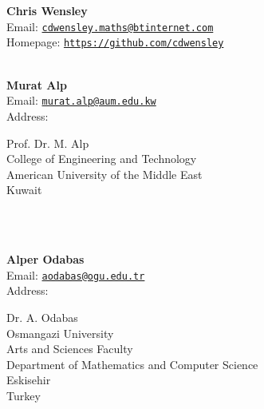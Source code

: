 \documentclass[a4paper,11pt]{report}
\begin{document}
\begin{titlepage}
\mbox{}\\
{\mbox{}\\
\small \noindent \textbf{ Chris Wensley\\
   }  Email: \href{mailto://cdwensley.maths@btinternet.com} {\texttt{cdwensley.maths@btinternet.com}}\\
  Homepage: \href{https://github.com/cdwensley} {\texttt{https://github.com/cdwensley}}}\\
{\mbox{}\\
\small \noindent \textbf{ Murat Alp\\
   }  Email: \href{mailto://murat.alp@aum.edu.kw} {\texttt{murat.alp@aum.edu.kw}}\\
  Address: \begin{minipage}[t]{8cm}\noindent
 Prof. Dr. M. Alp\\
 College of Engineering and Technology\\
 American University of the Middle East\\
 Kuwait\\
 \end{minipage}
}\\
{\mbox{}\\
\small \noindent \textbf{ Alper Odabas\\
   }  Email: \href{mailto://aodabas@ogu.edu.tr} {\texttt{aodabas@ogu.edu.tr}}\\
  Address: \begin{minipage}[t]{8cm}\noindent
 Dr. A. Odabas \\
 Osmangazi University \\
 Arts and Sciences Faculty \\
 Department of Mathematics and Computer Science \\
 Eskisehir \\
 Turkey\\
 \end{minipage}
}\\
\end{titlepage}
\end{document}

